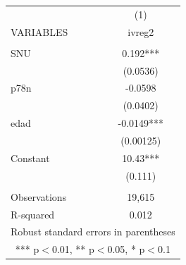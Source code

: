 \begin{tabular}{lc} \hline
 & (1) \\
VARIABLES & ivreg2 \\ \hline
 &  \\
SNU & 0.192*** \\
 & (0.0536) \\
p78n & -0.0598 \\
 & (0.0402) \\
edad & -0.0149*** \\
 & (0.00125) \\
Constant & 10.43*** \\
 & (0.111) \\
 &  \\
Observations & 19,615 \\
 R-squared & 0.012 \\ \hline
\multicolumn{2}{c}{ Robust standard errors in parentheses} \\
\multicolumn{2}{c}{ *** p$<$0.01, ** p$<$0.05, * p$<$0.1} \\
\end{tabular}
